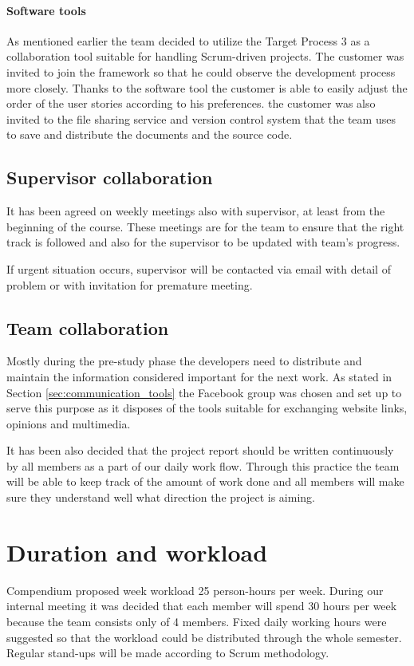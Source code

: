 \paragraph{Software tools}
As mentioned earlier the team decided to utilize the Target Process 3 as a collaboration tool suitable for handling Scrum-driven projects. The customer was invited to join the framework so that he could observe the development process more closely. Thanks to the software tool the customer is able to easily adjust the order of the user stories according to his preferences. the customer was also invited to the file sharing service and version control system that the team uses to save and distribute the documents and the source code.

\subsection{Supervisor collaboration}
It has been agreed on weekly meetings also with supervisor, at least from the beginning of the course.
These meetings are for the team to ensure that the right track is followed and also for the supervisor to be updated with team's progress.

If urgent situation occurs, supervisor will be contacted via email with detail of problem or with invitation for premature meeting.

\subsection{Team collaboration}
Mostly during the pre-study phase the developers need to distribute and maintain the information considered important for the next work. As stated in Section \ref{sec:communication_tools} the Facebook group was chosen and set up to serve this purpose as it disposes of the tools suitable for exchanging website links, opinions and multimedia.

It has been also decided that the project report should be written continuously by all members as a part of our daily work flow. Through this practice the team will be able to keep track of the amount of work done and all members will make sure they understand well what direction the project is aiming.

\section{Duration and workload}
\label{sec:duration_and_workload}
Compendium proposed week workload 25 person-hours per week. 
During our internal meeting it was decided that each member will spend 30 hours per week because the team consists only of 4 members. 
Fixed daily working hours were suggested so that the workload could be distributed through the whole semester.
Regular stand-ups will be made according to Scrum methodology.


